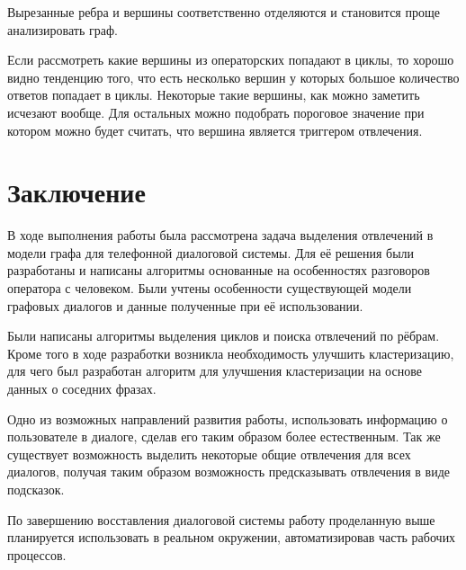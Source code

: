 \documentclass[specification,annotation]{itmo-student-thesis}
\begin{document}
	Вырезанные ребра и вершины соответственно отделяются и становится проще анализировать граф.
	
	Если рассмотреть какие вершины из операторских попадают в циклы, то хорошо видно тенденцию того, что есть несколько вершин у которых большое количество ответов попадает в циклы. Некоторые такие вершины, как можно заметить исчезают вообще. Для остальных можно подобрать пороговое значение при котором можно будет считать, что вершина является триггером отвлечения.
	
	\chapter{Заключение}
	В ходе выполнения работы была рассмотрена задача выделения отвлечений в модели графа для телефонной диалоговой системы. Для её решения были разработаны и написаны алгоритмы основанные на особенностях разговоров оператора с человеком. Были учтены особенности существующей модели графовых диалогов и данные полученные при её использовании.
	
	Были написаны алгоритмы выделения циклов и поиска отвлечений по рёбрам. Кроме того в ходе разработки возникла необходимость улучшить кластеризацию, для чего был разработан алгоритм для улучшения кластеризации на основе данных о соседних фразах.
	
	Одно из возможных направлений развития работы, использовать информацию о пользователе в диалоге, сделав его таким образом более естественным. Так же существует возможность выделить некоторые общие отвлечения для всех диалогов, получая таким образом возможность предсказывать отвлечения в виде подсказок.
	
	По завершению восставления диалоговой системы работу проделанную выше планируется использовать в реальном окружении, автоматизировав часть рабочих процессов.
	
\end{document}
